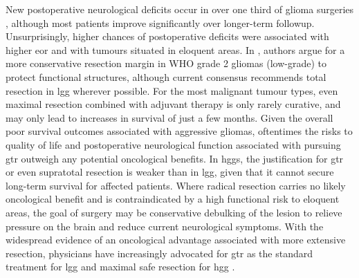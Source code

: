 New postoperative neurological deficits occur in over one third of glioma surgeries \autocite{Zetterling2020a}, although most patients improve significantly over longer-term followup.
Unsurprisingly, higher chances of postoperative deficits were associated with higher \gls{eor} and with tumours situated in eloquent areas\autocite{Zetterling2020a}.
In \textcite{Gil-Robles2010}, authors argue for a more conservative resection margin in WHO grade 2 gliomas (low-grade) to protect functional structures, although current consensus recommends total resection in \gls{lgg} wherever possible\autocite{Rincon-Torroella2019,Albuquerque2021}. %
For the most malignant tumour types, even maximal resection combined with adjuvant therapy is only rarely curative, and may only lead to increases in survival of just a few months\autocite{Rincon-Torroella2019,Karschnia2023}.
Given the overall poor survival outcomes associated with aggressive gliomas, oftentimes the risks to quality of life and postoperative neurological function associated with pursuing \gls{gtr} outweigh any potential oncological benefits\autocite{Rahman2016,Tabor2021}.
In \glspl{hgg}, the justification for \gls{gtr} or even supratotal resection is weaker than in \gls{lgg}, given that it cannot secure long-term survival for affected patients. 
Where radical resection carries no likely oncological benefit and is contraindicated by a high functional risk to eloquent areas, the goal of surgery may be conservative debulking of the lesion to relieve pressure on the brain and reduce current neurological symptoms.
With the widespread evidence of an oncological advantage associated with more extensive resection, physicians have increasingly advocated for \gls{gtr} as the standard treatment for \gls{lgg} and maximal safe resection for \gls{hgg} \autocite{Rincon-Torroella2019}.
